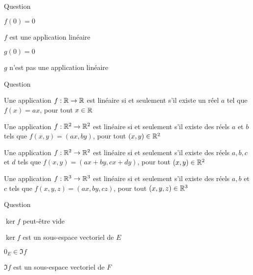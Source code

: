 \begin{multi}[multiple,feedback=
{On vérifie que \(f\) et \(g\) sont linéaires.
}]{Question}
    \item* \(f(0)=0\)
    \item* \(f\) est une application linéaire
    \item* \(g(0)=0\)
    \item \(g\) n'est pas une application linéaire
\end{multi}


\begin{multi}[multiple,feedback=
{Une application \(f:\Rr^n \to \Rr^m\) est linéaire si et seulement s'il existe des réels \(a_{i,j}, 1\le i \le m, 1\le j \le n\),  tels que :\\ \(f(x_1,x_2,\dots,x_n)=(a_{1,1}x_1+a_{1,2}x_2 + \dots + a_{1,n}x_n,\dots, a_{m,1}x_1+a_{m,2}x_2 + \dots + a_{m,n}x_n)\), pour tout \((x_1,x_2,\dots,x_n) \in \Rr^n\).
}]{Question}
    \item* Une application \(f:\mathbb{R} \to \mathbb{R}\) est linéaire si et seulement s'il existe un réel \(a\) tel que \(f(x)=ax\), pour tout \(x\in \mathbb{R}\)
    \item Une application \(f:\mathbb{R}^2 \to \mathbb{R}^2\) est linéaire si et seulement s'il existe des réels \(a\) et \(b\) tels que \(f(x,y)=(ax,by)\), pour tout \((x,y) \in \mathbb{R}^2\)
    \item* Une application \(f:\mathbb{R}^2 \to \mathbb{R}^2\) est linéaire si et seulement s'il existe des réels \(a,b,c\) et \(d\) tels que \(f(x,y)=(ax+by,cx+dy)\), pour tout \((x,y)\in \mathbb{R}^2\)
    \item Une application \(f:\mathbb{R}^3 \to \mathbb{R}^3\) est linéaire si et seulement s'il existe des réels \(a,b\) et \(c\) tels que \(f(x,y,z)=(ax,by,cz)\), pour tout \((x,y,z)\in \mathbb{R}^3\)
\end{multi}


\begin{multi}[multiple,feedback=
{\(\ker f\) est un sous-espace vectoriel de \(E\), il contient au moins \(0_E\).
\vskip0mm
\(\Im f \) est un sous-espace vectoriel de \(F\), il contient au moins \(0_F\), puisque \(f(0_E)=0_F\).
}]{Question}
    \item \(\ker f\) peut-être vide
    \item* \(\ker f\) est un sous-espace vectoriel de \(E\)
    \item \(0_E \in \Im f\)
    \item* \(\Im f\) est un sous-espace vectoriel de \(F\)
\end{multi}


